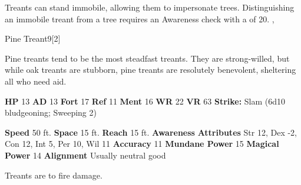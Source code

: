         Treants can stand immobile, allowing them to impersonate trees.
        Distinguishing an immobile treant from a tree requires an Awareness check with a  of 20.
  ,
  \begin{monsubsection}{Pine Treant}{9}[2]
    \vspace{-1em}\vspace{-1em}
    \vspace{0em}

    
         Pine treants tend to be the most steadfast treants.
         They are strong-willed, but while oak treants are stubborn, pine treants are resolutely benevolent, sheltering all who need aid.
      
    

    \begin{spellcontent}
      \begin{spelltargetinginfo}
        \pari \textbf{HP} 13 \monsep
          \textbf{AD} 13 \monsep
          \textbf{Fort} 17 \monsep
          \textbf{Ref} 11 \monsep
          \textbf{Ment} 16
        \pari \textbf{WR} 22 \monsep
        \textbf{VR} 63
        \pari \textbf{Strike:}
            Slam  (6d10 bludgeoning; Sweeping 2)
      \end{spelltargetinginfo}
    \end{spellcontent}
    \begin{monsterfooter}
      \pari \textbf{Speed} 50 ft. \monsep
        \textbf{Space} 15 ft. \monsep
        \textbf{Reach} 15 ft.
      \pari \textbf{Awareness} 
      \pari \textbf{Attributes}
        Str 12, Dex -2,
        Con 12, Int 5,
        Per 10, Wil 11
      \pari \textbf{Accuracy} 11 \monsep
        \textbf{Mundane Power} 15 \monsep
      \textbf{Magical Power} 14
      \pari \textbf{Alignment} Usually neutral good
    \end{monsterfooter}
  \end{monsubsection}
        Treants are  to fire damage.
      
